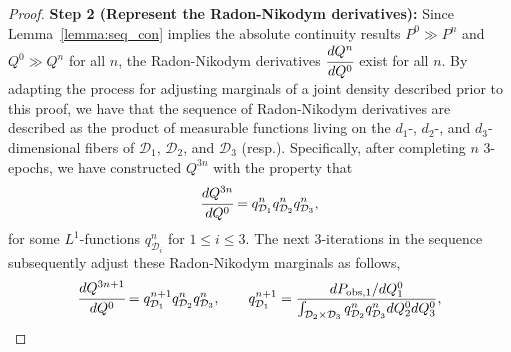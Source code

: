 \documentclass{article}
\begin{document}
\begin{proof}
{\bf Step 2 (Represent the Radon-Nikodym derivatives):} 
Since Lemma~\ref{lemma:seq_con} implies the absolute continuity results $P^0\gg P^n$ and $Q^0\gg Q^n$ for all $n$, the Radon-Nikodym derivatives $\cfrac{dQ^{n}}{dQ^{0}}$ exist for all $n$. 
By adapting the process for adjusting marginals of a joint density described prior to this proof, we have that the sequence of Radon-Nikodym derivatives are described as the product of measurable functions living on the $d_1$-, $d_2$-, and $d_3$-dimensional fibers of $\mathcal{D}_{1}$, $\mathcal{D}_{2}$, and $\mathcal{D}_{3}$ (resp.).
Specifically, after completing $n$ 3-epochs, we have constructed $Q^{3n}$ with the property that
\begin{equation*}
    \cfrac{dQ^{3n}}{dQ^{0}}= q^{n}_{\mathcal{D}_{1}}q^{n}_{\mathcal{D}_{2}}q^{n}_{\mathcal{D}_{3}}, 
\end{equation*}
for some $L^1$-functions $q_{\mathcal{D}_i}^n$ for $1\leq i\leq 3$. 
The next 3-iterations in the sequence subsequently adjust these Radon-Nikodym marginals as follows, 
\begin{equation*}
    \cfrac{dQ^{3n+1}}{dQ^{0}} = q^{n+1}_{\mathcal{D}_{1}}q^{n}_{\mathcal{D}_{2}}q^{n}_{\mathcal{D}_{3}}, \qquad q^{n+1}_{\mathcal{D}_{1}} = \frac{dP_{\text{obs},1}/dQ_{1}^{0}}{\int_{\mathcal{D}_{2} \times \mathcal{D}_{3}}q^{n}_{\mathcal{D}_{2}}q^{n}_{\mathcal{D}_{3}} dQ^{0}_{2}dQ^{0}_{3}}, 

\end{equation*}
\end{proof}
\end{document}
